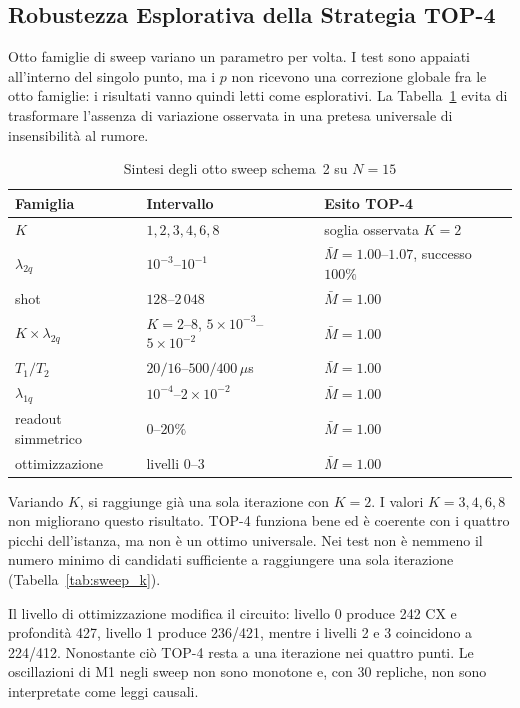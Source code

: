 \begin{onehalfspace}
\section{Robustezza Esplorativa della Strategia TOP-4}
\label{sec:parametri_mitigazione}
\label{subsec:sintesi_parametri}

Otto famiglie di sweep variano un parametro per volta. I test sono
appaiati all'interno del singolo punto, ma i $p$ non ricevono una
correzione globale fra le otto famiglie: i risultati vanno quindi letti
come esplorativi. La Tabella~\ref{tab:sintesi_parametri} evita di
trasformare l'assenza di variazione osservata in una pretesa universale
di insensibilità al rumore.

\begin{table}[H]
\centering
\caption{Sintesi degli otto sweep schema~2 su $N=15$}
\label{tab:sintesi_parametri}
\begin{tabularx}{\textwidth}{llX}
\toprule
\textbf{Famiglia} & \textbf{Intervallo} & \textbf{Esito TOP-4} \\
\midrule
$K$ & $1,2,3,4,6,8$ & soglia osservata $K=2$ \\
$\lambda_{2q}$ & $10^{-3}$--$10^{-1}$ & $\bar M=1.00$--$1.07$, successo $100\%$ \\
shot & $128$--$2\,048$ & $\bar M=1.00$ \\
$K\times\lambda_{2q}$ & $K=2$--8, $5\times10^{-3}$--$5\times10^{-2}$ & $\bar M=1.00$ \\
$T_1/T_2$ & $20/16$--$500/400\,\mu$s & $\bar M=1.00$ \\
$\lambda_{1q}$ & $10^{-4}$--$2\times10^{-2}$ & $\bar M=1.00$ \\
readout simmetrico & $0$--$20\%$ & $\bar M=1.00$ \\
ottimizzazione & livelli 0--3 & $\bar M=1.00$ \\
\bottomrule
\end{tabularx}
\end{table}

Variando $K$, si raggiunge già una sola iterazione con $K=2$. I valori $K=3,4,6,8$ non migliorano questo risultato. TOP-4 funziona bene ed è coerente con i quattro picchi dell'istanza, ma non è un ottimo universale. Nei test non è nemmeno il numero minimo di candidati sufficiente a raggiungere una sola iterazione (Tabella~\ref{tab:sweep_k}).

Il livello di ottimizzazione modifica il circuito: livello 0 produce 242
CX e profondità 427, livello 1 produce 236/421, mentre i livelli 2 e 3
coincidono a 224/412. Nonostante ciò TOP-4 resta a una iterazione nei
quattro punti. Le oscillazioni di M1 negli sweep non sono monotone e, con
30 repliche, non sono interpretate come leggi causali.


\end{onehalfspace}
